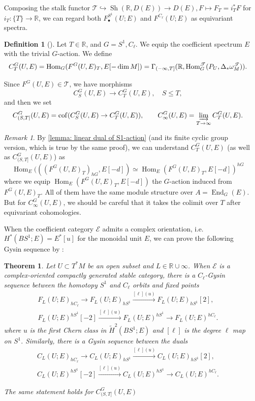 \documentclass[11pt]{amsart}
\numberwithin{equation}{section}
\theoremstyle{plain}
\newtheorem{Thm}{Theorem}[section]
\theoremstyle{definition}
\newtheorem{Def}[def]{Definition}
\theoremstyle{remark}
\newtheorem{RMK}[rmk]{Remark}
\newcommand{\bR} { {\mathbb{R}}}
\newcommand{\cE} { {\mathcal{E}}}
\newcommand{\sT} { {\mathscr{T}}}
\newcommand{\HOM}{{ \textnormal{Hom}  }}
\newcommand{\Sh} { {\operatorname{Sh}}}
\newcommand\End{\operatorname{End}}
\newcommand\Hom{\operatorname{Hom}}
\newcommand\cof{\operatorname{cof}}
\begin{document}
Composing the stalk functor $\sT\hookrightarrow \Sh(\bR,D(E))\to D(E),F\mapsto F_T=i_T^*F$ for $i_T:\{T\}\to \bR$, we can regard both $F^{S^1}_\bullet(U; E)$ and $F^{C_\ell}(U; E)$ as equivariant spectra.

\begin{Def}[{\cite{Capacities2021,CyclicZHANG}}]
Let $T\in \bR$, and $G=S^1,C_\ell$. We equip the coefficient spectrum  $E$  with the trivial $G$-action. We define
\begin{equation}\label{eq: C_T formula}
C^{G}_T(U,E)=\HOM_{G}(F^G(U,E)_{T},E [-\dim M]) = \Gamma_{(-\infty,T]}(\bR, \Hom_G^\sT(P_U, \Delta_*\omega_M^\sT)).
\end{equation}

Since $F^G(U,E)\in\sT$, we have morphisms 
\[C^{G}_S(U,E) \to C^{G}_T(U,E),\quad S\leq T,\]
and then we set
\[C^{G}_{(S,T]}(U,E)=\cof(C^{G}_S(U,E) \to C^{G}_T(U,E)),\qquad C^{G}_\infty(U,E) =\varinjlim_{T\to \infty} C^{G}_T(U,E).\]
\end{Def}
\begin{RMK}By \autoref{lemma: linear dual of S1-action} (and its finite cyclic group version, which is true by the same proof), we can understand $C^{G}_T(U,E)$ (as well as $C^{G}_{(S,T]}(U,E)$) as
\[\Hom_E(((F^G(U,E)_{T})_{hG},E[-d])\simeq \Hom_E(F^G(U,E)_{T},E[-d])^{hG}\]
where we equip $\Hom_E(F^G(U,E)_{T},E[-d])$ the $G$-action induced from $F^G(U,E)_{T}$. All of them have the same module structure over $A=\End_G(E)$. But for $C^{G}_{\infty}(U,E)$, we should be careful that it takes the colimit over $T$ after equivariant cohomologies.
\end{RMK}

When the coefficient category $\cE$ admits a complex orientation, i.e.~$H^*(BS^1; E) = E^*[u]$ for the monoidal unit $E$, we can prove the following Gysin sequence by \cite[Theorem 1.7]{Li-Zhang26-1}:

\begin{Thm}\label{thm: Gysin}
    Let $U \subset T^*M$ be an open subset and $L\in \bR\cup\infty$.  When $\cE$ is a complex-oriented compactly generated stable category, there is a $C_\ell$-Gysin sequence between the homotopy $S^1$ and $C_\ell$ orbits and fixed points
    \begin{gather*}
    F_L(U; E)_{hC_\ell} \to F_L(U; E)_{hS^1} \xrightarrow{[\ell](u)} F_L(U; E)_{hS^1}[2],\\
    F_L(U; E)^{hS^1}[-2] \xrightarrow{[\ell](u)} F_L(U; E)^{hS^1} \to F_L(U; E)^{hC_\ell} .
    \end{gather*}
    where $u$ is the first Chern class in $\widetilde{H}^2(BS^1; E)$ and $[\ell]$ is the degree $\ell$ map on $S^1$. Similarly, there is a Gysin sequence between the duals
    \begin{gather*}C_L(U; E)_{hC_\ell} \to C_L(U; E)_{hS^1} \xrightarrow{[\ell](u)} C_L(U; E)_{hS^1}[2],\\
    C_L(U; E)^{hS^1}[-2] \xrightarrow{[\ell](u)} C_L(U; E)^{hS^1} \to C_L(U; E)^{hC_\ell} .
    \end{gather*}

    The same statement holds for $C^{G}_{(S,T]}(U,E)$
\end{Thm}
\end{document}
